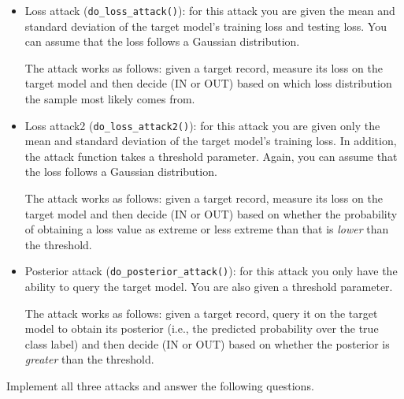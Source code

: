 \begin{itemize}

	\item Loss attack (\texttt{do\_loss\_attack()}): for this attack you are given the mean and standard deviation of the target model's training loss and testing loss. You can assume that the loss follows a Gaussian distribution. 
	
	\medskip \noindent The attack works as follows: given a target record, measure its loss on the target model and then decide (IN or OUT) based on which loss distribution the sample most likely comes from.
	
	\item Loss attack2 (\texttt{do\_loss\_attack2()}): for this attack you are given only the mean and standard deviation of the target model's training loss. In addition, the attack function takes a threshold parameter. Again, you can assume that the loss follows a Gaussian distribution.
	
	\medskip \noindent The attack works as follows: given a target record, measure its loss on the target model and then decide (IN or OUT) based on whether the probability of obtaining a loss value as extreme or less extreme than that is {\em lower} than the threshold.
	
	\item Posterior attack (\texttt{do\_posterior\_attack()}): for this attack you only have the ability to query the target model. You are also given a threshold parameter. 
	
	\medskip \noindent The attack works as follows: given a target record, query it on the target model to obtain its posterior (i.e., the predicted probability over the true class label) and then decide (IN or OUT) based on whether the posterior is {\em greater} than the threshold.

\end{itemize}


\medskip \noindent Implement all three attacks and answer the following questions.

